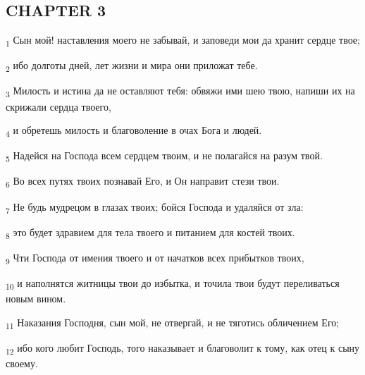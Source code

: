 \subsection{CHAPTER 3}
\begin{tcolorbox}
\textsubscript{1} Сын мой! наставления моего не забывай, и заповеди мои да хранит сердце твое;
\end{tcolorbox}
\begin{tcolorbox}
\textsubscript{2} ибо долготы дней, лет жизни и мира они приложат тебе.
\end{tcolorbox}
\begin{tcolorbox}
\textsubscript{3} Милость и истина да не оставляют тебя: обвяжи ими шею твою, напиши их на скрижали сердца твоего,
\end{tcolorbox}
\begin{tcolorbox}
\textsubscript{4} и обретешь милость и благоволение в очах Бога и людей.
\end{tcolorbox}
\begin{tcolorbox}
\textsubscript{5} Надейся на Господа всем сердцем твоим, и не полагайся на разум твой.
\end{tcolorbox}
\begin{tcolorbox}
\textsubscript{6} Во всех путях твоих познавай Его, и Он направит стези твои.
\end{tcolorbox}
\begin{tcolorbox}
\textsubscript{7} Не будь мудрецом в глазах твоих; бойся Господа и удаляйся от зла:
\end{tcolorbox}
\begin{tcolorbox}
\textsubscript{8} это будет здравием для тела твоего и питанием для костей твоих.
\end{tcolorbox}
\begin{tcolorbox}
\textsubscript{9} Чти Господа от имения твоего и от начатков всех прибытков твоих,
\end{tcolorbox}
\begin{tcolorbox}
\textsubscript{10} и наполнятся житницы твои до избытка, и точила твои будут переливаться новым вином.
\end{tcolorbox}
\begin{tcolorbox}
\textsubscript{11} Наказания Господня, сын мой, не отвергай, и не тяготись обличением Его;
\end{tcolorbox}
\begin{tcolorbox}
\textsubscript{12} ибо кого любит Господь, того наказывает и благоволит к тому, как отец к сыну своему.
\end{tcolorbox}
